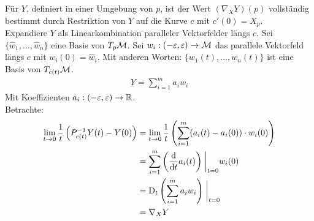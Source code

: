 \begin{bew}
Für $Y$, definiert in einer Umgebung von $p$, ist der Wert $(\nabla_X Y)(p)$ vollständig bestimmt durch Restriktion von $Y$ auf die Kurve $c$ mit $c'(0) = X_p$.\\
Expandiere $Y$ als Linearkombination paralleler Vektorfelder längs $c$.
Sei $\{ \hat{w}_1, \dots, \hat{w}_n \}$ eine Basis von $T_p \mathcal{M}$.
Sei $w_i : (-\varepsilon, \varepsilon) \to \mathcal{M}$ das parallele Vektorfeld längs $c$ mit $w_i(0) = \hat{w}_i$.
Mit anderen Worten: $\{ w_1(t), \dots, w_n (t)\}$ ist eine Basis von $T_{c(t)}\mathcal{M}$.
\begin{align*}
Y = \sum^m_{i=1} a_i w_i
\end{align*}
Mit Koeffizienten $a_i: (-\varepsilon , \varepsilon) \to \mathbb{R}$.\\
Betrachte:
\begin{align*}
\lim\limits_{t \rightarrow 0} \frac{1}{t} \left( P^{-1}_{c(t)} Y(t) - Y(0)\right) &=  \lim\limits_{t \rightarrow 0} \frac{1}{t} \left( \sum^m_{i=1} (a_i (t) - a_i (0)) \cdot w_i (0) \right)\\
&= \sum^m_{i=1} \left( \dv{t} a_i (t) \right) \eval_{t=0} w_i (0)\\
&= \covd_t \left( \sum^m_{i=1} a_i w_i \right) \eval_{t=0}\\
&= \nabla_X Y
\end{align*}
\end{bew}

